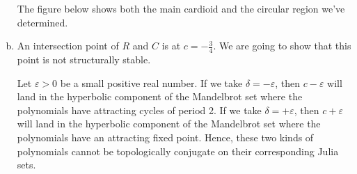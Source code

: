 \begin{problem}
\begin{enumerate}[a)]
    The figure below shows both the main cardioid and the circular region we've determined.

    \begin{figure}[htbp]
        \centering
    \end{figure}

    \item An intersection point of \(R\) and \(C\) is at \(c = -\frac{3}{4}\). We are going to show that this point is not structurally stable.
    
    Let \(\varepsilon > 0\) be a small positive real number. If we take \(\delta = -\varepsilon\), then \(c - \varepsilon\) will land in the hyperbolic component of the Mandelbrot set where the polynomials have attracting cycles of period 2. If we take \(\delta = +\varepsilon\), then \(c + \varepsilon\) will land in the hyperbolic component of the Mandelbrot set where the polynomials have an attracting fixed point. Hence, these two kinds of polynomials cannot be topologically conjugate on their corresponding Julia sets.
\end{enumerate}
\end{problem}

